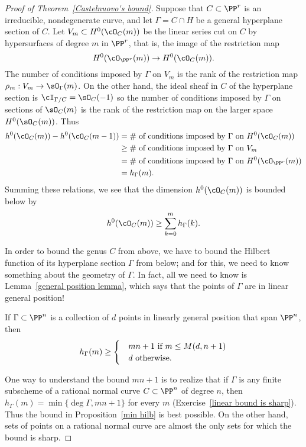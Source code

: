 \begin{proof}[Proof of Theorem~\ref{Castelnuovo's bound}]
Suppose that $C \subset \PP^r$ is an irreducible, nondegenerate curve, and let $\Gamma = C \cap H$ be a general hyperplane section of $C$. Let $V_m \subset H^0(\cO_C(m))$ be the linear series cut on $C$ by hypersurfaces of degree $m$ in $\PP^r$, that is, the image of the restriction map
$$
H^0(\cO_{\PP^r}(m)) \to H^0(\cO_C(m)).
$$
The number of  conditions imposed by $\Gamma$ on $V_m$ is the rank of the restriction map 
$\rho_m: V_m \to \sO_\Gamma(m)$. On the other hand,
the ideal sheaf in $C$ of the hyperplane section is $\cI_{\Gamma/C} = \sO_C(-1)$ so
the number of conditions imposed by $\Gamma$ on sections of $\sO_C(m)$ is the rank 
of the restriction map on the larger space $H^0(\sO_C(m))$. Thus
\begin{align*}
h^0(\cO_C(m)) - h^0(\cO_C(m-1)) & = \text{\# of conditions imposed by $\Gamma$ on $H^0(\cO_C(m))$}\\
&\geq \text{\# of conditions imposed by $\Gamma$ on $V_m$} \\
&= \text{\# of conditions imposed by $\Gamma$ on $H^0(\cO_{\PP^r}(m))$} \\
&= h_\Gamma(m).
\end{align*}
Summing these relations, we see that the dimension $h^0(\cO_C(m))$ is bounded below by
$$
h^0(\cO_C(m)) \geq \sum_{k=0}^m h_\Gamma(k).
$$

In order to bound the genus $C$ from above, we have to bound the Hilbert function of its hyperplane section $\Gamma$  from below; and for this, we need to know something about the geometry of $\Gamma$. In fact, all we need to know is Lemma~\ref{general position lemma}, which says that the points of $\Gamma$ are in linear general position! 

\begin{proposition}\label{min hilb}
If $\Gamma \subset \PP^n$ is a collection of $d$ points in linearly general position that span $\PP^n$, then 
$$
h_\Gamma(m) \geq 
\begin{cases}
&mn+1\hbox{ if $m\leq M(d,n+1)$}\\
&d \hbox{ otherwise.}
\end{cases}
$$
\end{proposition}

One way to understand the bound $mn+1$ is to realize that if $\Gamma$ is any finite subscheme of a rational normal curve $C\subset\PP^n$ of degree $n$, 
then $h_\Gamma(m) = \min\{\deg \Gamma, mn+1\}$ for every $m$ (Exercise~\ref{linear bound is sharp}).
  Thus the bound in Proposition~\ref{min hilb} is best possible.
On the other hand, sets of points on a rational normal curve are almost the only sets for which the bound is sharp.


\end{proof}
